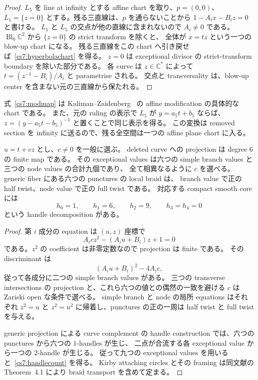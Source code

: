 \begin{proof}
$L_5$ を line at infinity とする affine chart を取り、$p=(0,0)$、
$L_1=\{z=0\}$ とする。残る三直線は、$p$ を通らないことから
$1-A_i x-B_i z=0$ と書ける。
$L_1$ と $L_5$ の交点が他の直線に含まれないので $A_i\ne0$ である。
$\operatorname{Bl}_0\mathbb C^2$ から $\{z=0\}$ の strict transform を除くと、
全体が $x=tz$ という一つの blow-up chart になる。
残る三直線をこの chart へ引き戻せば~\eqref{cs7:hyperbolachart} を得る。
$z=0$ は exceptional divisor の strict-transform boundary を除いた部分である。
各 curve は $z\in\mathbb C^*$ によって
$t=(z^{-1}-B_i)/A_i$ と parametrise される。
交点と transversality は、blow-up center を含まない元の三直線から保たれる。
\end{proof}

式~\eqref{cs7:modmap} は Kaliman--Zaidenberg~\cite[\S\S1--3]{KalimanZaidenberg}
の affine modification の具体的な chart である。
また、元の ruling の表示で $L_5$ が $y=a_5t+b_5$ ならば、
$z=(y-a_5t-b_5)^{-1}$ と置くことで同じ表示を得る。
この変換は removed section を infinity に送るので、残る全空間は一つの affine plane chart に入る。

\begin{proposition}
\label{cs7:finiteprojection}
$u=t+c z$ とし、$c\ne0$ を一般に選ぶ。
deleted curve への projection は degree $6$ の finite map である。
その exceptional values は六つの simple branch values と三つの node values の合計九個であり、
全て相異なるように $c$ を選べる。
generic fiber にある六つの punctures の local braid は、
branch value で正の half twist、node value で正の full twist である。
対応する compact smooth core には
\begin{equation}
 h_0=1,\qquad h_1=6,\qquad h_2=9,\qquad h_3=h_4=0
 \label{cs7:handlecount}
\end{equation}
という handle decomposition がある。
\end{proposition}

\begin{proof}
第 $i$ 成分の equation は $(u,z)$ 座標で
\[
 A_i c z^2-(A_i u+B_i)z+1=0
\]
である。$z^2$ の coefficient は非零定数なので projection は finite である。
その discriminant は
\[
 (A_i u+B_i)^2-4A_i c,
\]
従って各成分に二つの simple branch values がある。
三つの transverse intersections の projection と、これら六つの値との偶然の一致を避ける
$c$ は Zariski open な条件で選べる。
simple branch と node の局所 equations はそれぞれ
$z^2=u$ と $z^2=u^2$ に帰着し、punctures の正の一周は
half twist と full twist を与える。

generic projection による curve complement の handle construction
\cite[Proposition~3.1, Theorem~3.7]{Sugawara}
では、六つの punctures から六つの $1$-handles が生じ、
二点が合流する各 exceptional value から一つの $2$-handle が生じる。
従って九つの exceptional values を用いると~\eqref{cs7:handlecount} を得る。
Kirby attaching circles とその framing は同文献の Theorem~4.1 により
braid transport を含めて定まる。
\end{proof}

